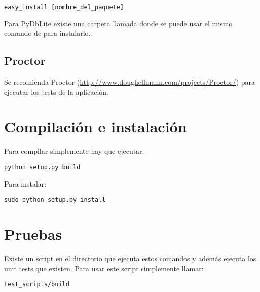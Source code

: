 \begin{verbatim}
easy_install [nombre_del_paquete]
\end{verbatim}

Para PyDbLite existe una carpeta llamada  donde se puede usar el mismo comando de  para instalarlo.

\subsection{Proctor}

Se recomienda Proctor (\url{http://www.doughellmann.com/projects/Proctor/}) para ejecutar los tests de la aplicación.

\section{Compilación e instalación}

Para compilar simplemente hay que ejecutar:

\begin{verbatim}
python setup.py build
\end{verbatim}

Para instalar:

\begin{verbatim}
sudo python setup.py install
\end{verbatim}

\section{Pruebas}

Existe un script en el directorio  que ejecuta estos comandos y además ejecuta los unit tests que existen. Para usar este script simplemente llamar:

\begin{verbatim}
test_scripts/build
\end{verbatim}



